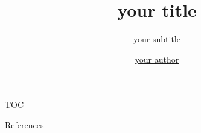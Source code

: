 \documentclass{beamer}
\title[your short title]{your title}
\subtitle{your subtitle}
\author{\href{}{your author}}
\institute[your abbrv]{your organisation}
\begin{document}
\maketitle

\begin{frame}{TOC}
    \tableofcontents
\end{frame}







\nocite{*}

\begin{frame}[allowframebreaks]{References}
    \printbibliography
\end{frame}
\end{document}
